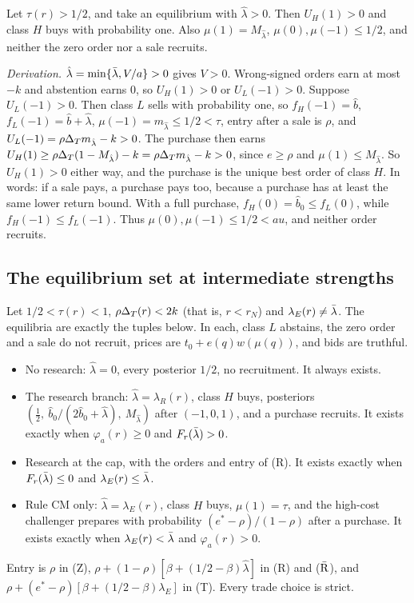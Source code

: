 \begin{resultbox}
Let \(\tau(r)>1/2\), and take an equilibrium with \(\hat\lambda>0\). Then \(U_H(1)>0\) and class \(H\) buys with probability
one. Also \(\mu(1)=M_{\hat\lambda}\), \(\mu(0),\mu(-1)\le1/2\), and neither the zero order nor a sale recruits.
\end{resultbox}
\emph{Derivation.} \(\hat\lambda=\min\{\bar\lambda,V/a\}>0\) gives \(V>0\). Wrong-signed orders earn at most \(-k\) and abstention earns
\(0\), so \(U_H(1)>0\) or \(U_L(-1)>0\). Suppose \(U_L(-1)>0\). Then class \(L\) sells with probability one, so
\(f_H(-1)=\hat b\), \(f_L(-1)=\hat b+\hat\lambda\), \(\mu(-1)=m_{\hat\lambda}\le1/2<\tau\), entry after a sale is \(\rho\), and
\(U_L(-1)=\rho\Delta_T m_{\hat\lambda}-k>0\). The purchase then earns
\(U_H(1)\ge\rho\Delta_T(1-M_{\hat\lambda})-k=\rho\Delta_T m_{\hat\lambda}-k>0\), since \(e\ge\rho\) and \(\mu(1)\le M_{\hat\lambda}\). So
\(U_H(1)>0\) either way, and the purchase is the unique best order of class \(H\). In words: if a sale pays, a purchase pays
too, because a purchase has at least the same lower return bound.
With a full purchase, \(f_H(0)=\hat b_0\le f_L(0)\), while \(f_H(-1)\le f_L(-1)\).
Thus \(\mu(0),\mu(-1)\le1/2<	au\), and neither order recruits.

\subsection{The equilibrium set at intermediate strengths}\label{sec:09_research-middle}

\begin{resultbox}
Let \(1/2<\tau(r)<1\), \(\rho\Delta_T(r)<2k\) (that is, \(r<r_N\)) and \(\lambda_E(r)\ne\bar\lambda\). The equilibria are exactly the
tuples below. In each, class \(L\) abstains, the zero order and a sale do not recruit, prices are \(t_0+e(q)w(\mu(q))\), and
bids are truthful.
\begin{itemize}[leftmargin=1.5em]
\item[(Z)] No research: \(\hat\lambda=0\), every posterior \(1/2\), no recruitment. It always exists.
\item[(R)] The research branch: \(\hat\lambda=\lambda_R(r)\), class \(H\) buys, posteriors
\((\tfrac12,\ \hat b_0/(2\hat b_0+\hat\lambda),\ M_{\hat\lambda})\) after \((-1,0,1)\), and a purchase recruits. It exists exactly
when \(\varphi_a(r)\ge0\) and \(F_r(\bar\lambda)>0\).
\item[(\(\bar{\rm R}\))] Research at the cap, with the orders and entry of (R). It exists exactly when \(F_r(\bar\lambda)\le0\) and
\(\lambda_E(r)\le\bar\lambda\).
\item[(T)] Rule CM only: \(\hat\lambda=\lambda_E(r)\), class \(H\) buys, \(\mu(1)=\tau\), and the high-cost challenger prepares
with probability \((e^*-\rho)/(1-\rho)\) after a purchase. It exists exactly when \(\lambda_E(r)<\bar\lambda\) and \(\varphi_a(r)>0\).
\end{itemize}
Entry is \(\rho\) in (Z), \(\rho+(1-\rho)[\beta+(1/2-\beta)\hat\lambda]\) in (R) and (\(\bar{\rm R}\)), and
\(\rho+(e^*-\rho)[\beta+(1/2-\beta)\lambda_E]\) in (T). Every trade choice is strict.
\end{resultbox}

